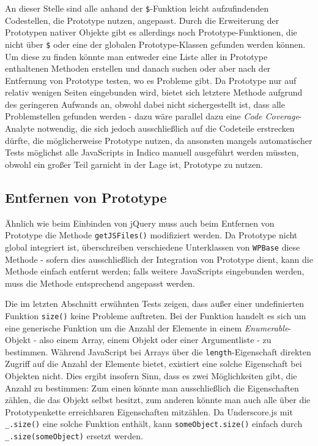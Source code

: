 An dieser Stelle sind alle anhand der \lstinline{$}-Funktion leicht aufzufindenden Codestellen, die
Prototype nutzen, angepasst. Durch die Erweiterung der Prototypen nativer Objekte gibt es allerdings
noch Prototype-Funktionen, die nicht über \lstinline{$} oder eine der globalen Prototype-Klassen
gefunden werden können. Um diese zu finden könnte man entweder eine Liste aller in Prototype
enthaltenen Methoden erstellen und danach suchen oder aber nach der Entfernung von Prototype testen,
wo es Probleme gibt. Da Prototype nur auf relativ wenigen Seiten eingebunden wird, bietet sich
letztere Methode aufgrund des geringeren Aufwands an, obwohl dabei nicht sichergestellt ist, dass
alle Problemstellen gefunden werden - dazu wäre parallel dazu eine \emph{Code Coverage}-Analyte
notwendig, die sich jedoch ausschließlich auf die Codeteile erstrecken dürfte, die möglicherweise
Prototype nutzen, da ansonsten mangels automatischer Tests möglichst alle JavaScripts in Indico
manuell ausgeführt werden müssten, obwohl ein großer Teil garnicht in der Lage ist, Prototype zu
nutzen.

\subsection{Entfernen von Prototype}

Ähnlich wie beim Einbinden von jQuery muss auch beim Entfernen von Prototype die Methode
\lstinline{getJSFiles()} modifiziert werden. Da Prototype nicht global integriert ist, überschreiben
verschiedene Unterklassen von \lstinline{WPBase} diese Methode - sofern dies ausschließlich der
Integration von Prototype dient, kann die Methode einfach entfernt werden; falls weitere JavaScripts
eingebunden werden, muss die Methode entsprechend angepasst werden.

Die im letzten Abschnitt erwähnten Tests zeigen, dass außer einer undefinierten Funktion
\lstinline{size()} keine Probleme auftreten. Bei der Funktion handelt es sich um eine generische
Funktion um die Anzahl der Elemente in einem \emph{Enumerable}-Objekt - also einem Array, einem
Objekt oder einer Argumentliste - zu bestimmen. Während JavaScript bei Arrays über die
\lstinline{length}-Eigenschaft direkten Zugriff auf die Anzahl der Elemente bietet, existiert eine
solche Eigenschaft bei Objekten nicht. Dies ergibt insofern Sinn, dass es zwei Möglichkeiten gibt,
die Anzahl zu bestimmen: Zum einen könnte man ausschließlich die Eigenschaften zählen, die das
Objekt selbst besitzt, zum anderen könnte man auch alle über die Prototypenkette erreichbaren
Eigenschaften mitzählen. Da Underscore.js mit \lstinline{_.size()} eine solche Funktion enthält,
kann \lstinline{someObject.size()} einfach durch \lstinline{_.size(someObject)} ersetzt werden.

